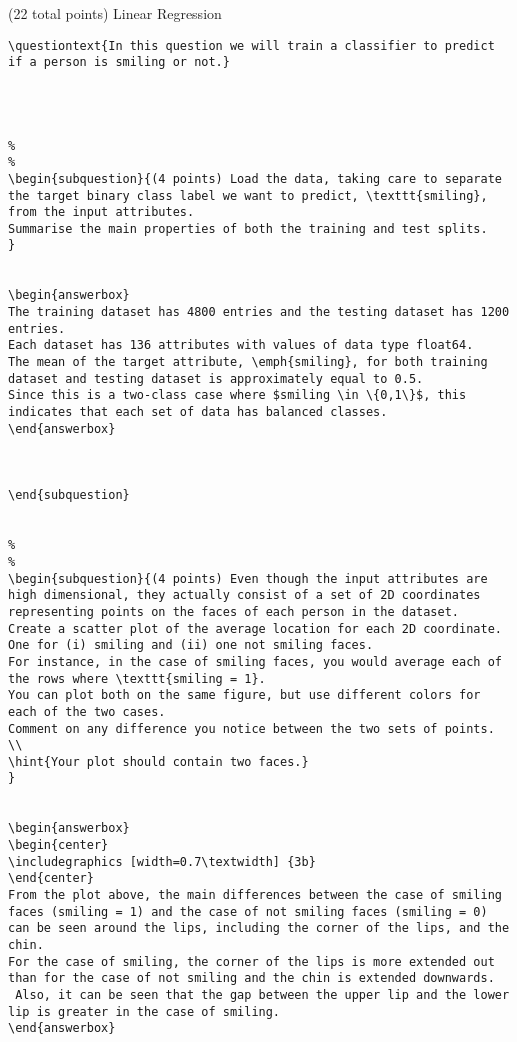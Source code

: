 \documentclass[12pt]{article}
\begin{document}
\begin{question}{(22 total points) Linear Regression}
\begin{subquestion}
\begin{answerbox}{20em}
\begin {verbatim}
\questiontext{In this question we will train a classifier to predict if a person is smiling or not.}




%
%
\begin{subquestion}{(4 points) Load the data, taking care to separate the target binary class label we want to predict, \texttt{smiling}, from the input attributes. 
Summarise the main properties of both the training and test splits. 
}


\begin{answerbox}{12em}
The training dataset has 4800 entries and the testing dataset has 1200 entries. 
Each dataset has 136 attributes with values of data type float64. 
The mean of the target attribute, \emph{smiling}, for both training dataset and testing dataset is approximately equal to 0.5. 
Since this is a two-class case where $smiling \in \{0,1\}$, this indicates that each set of data has balanced classes.
\end{answerbox}



\end{subquestion}


%
%
\begin{subquestion}{(4 points) Even though the input attributes are high dimensional, they actually consist of a set of 2D coordinates representing points on the faces of each person in the dataset. 
Create a scatter plot of the average location for each 2D coordinate. One for (i) smiling and (ii) one not smiling faces. 
For instance, in the case of smiling faces, you would average each of the rows where \texttt{smiling = 1}. 
You can plot both on the same figure, but use different colors for each of the two cases. 
Comment on any difference you notice between the two sets of points. \\
\hint{Your plot should contain two faces.}
}


\begin{answerbox}{35em}
\begin{center}
\includegraphics [width=0.7\textwidth] {3b}
\end{center}
From the plot above, the main differences between the case of smiling faces (smiling = 1) and the case of not smiling faces (smiling = 0) can be seen around the lips, including the corner of the lips, and the chin. 
For the case of smiling, the corner of the lips is more extended out than for the case of not smiling and the chin is extended downwards.
 Also, it can be seen that the gap between the upper lip and the lower lip is greater in the case of smiling.
\end{answerbox}




\end{verbatim}
\end{answerbox}
\end{subquestion}
\end{question}
\end{document}
